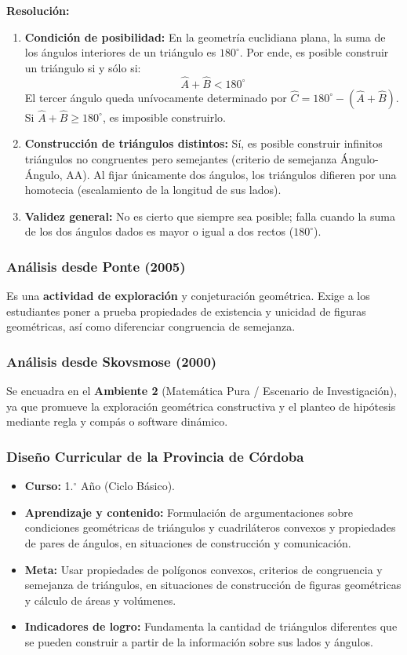 \documentclass[11pt,a4paper]{article}
\begin{document}
\textbf{Resolución:}
\begin{enumerate}
    \item \textbf{Condición de posibilidad:} En la geometría euclidiana plana, la suma de los ángulos interiores de un triángulo es $180^\circ$. Por ende, es posible construir un triángulo si y sólo si:
    \[
    \hat{A} + \hat{B} < 180^\circ
    \]
    El tercer ángulo queda unívocamente determinado por $\hat{C} = 180^\circ - (\hat{A} + \hat{B})$. Si $\hat{A} + \hat{B} \ge 180^\circ$, es imposible construirlo.
    \item \textbf{Construcción de triángulos distintos:} Sí, es posible construir infinitos triángulos no congruentes pero semejantes (criterio de semejanza Ángulo-Ángulo, AA). Al fijar únicamente dos ángulos, los triángulos difieren por una homotecia (escalamiento de la longitud de sus lados).
    \item \textbf{Validez general:} No es cierto que siempre sea posible; falla cuando la suma de los dos ángulos dados es mayor o igual a dos rectos ($180^\circ$).
\end{enumerate}

\subsubsection{Análisis desde Ponte (2005)}
Es una \textbf{actividad de exploración} y conjeturación geométrica. Exige a los estudiantes poner a prueba propiedades de existencia y unicidad de figuras geométricas, así como diferenciar congruencia de semejanza.

\subsubsection{Análisis desde Skovsmose (2000)}
Se encuadra en el \textbf{Ambiente 2} (Matemática Pura / Escenario de Investigación), ya que promueve la exploración geométrica constructiva y el planteo de hipótesis mediante regla y compás o software dinámico.

\subsubsection{Diseño Curricular de la Provincia de Córdoba}
\begin{itemize}
    \item \textbf{Curso:} 1.$^{\circ}$ Año (Ciclo Básico).
    \item \textbf{Aprendizaje y contenido:} Formulación de argumentaciones sobre condiciones geométricas de triángulos y cuadriláteros convexos y propiedades de pares de ángulos, en situaciones de construcción y comunicación.
    \item \textbf{Meta:} Usar propiedades de polígonos convexos, criterios de congruencia y semejanza de triángulos, en situaciones de construcción de figuras geométricas y cálculo de áreas y volúmenes.
    \item \textbf{Indicadores de logro:} Fundamenta la cantidad de triángulos diferentes que se pueden construir a partir de la información sobre sus lados y ángulos.
\end{itemize}
\end{document}
